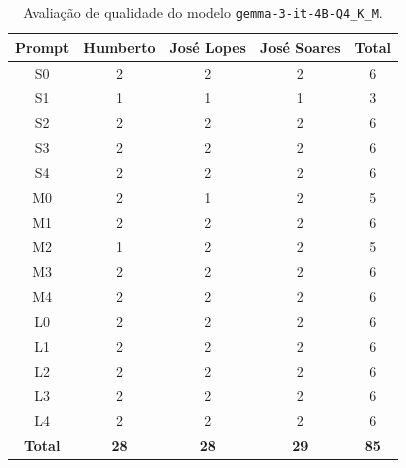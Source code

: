 \begin{table}[H]
    \centering
    \begin{tabular}{|c|c|c|c|c|}
        \hline
        \textbf{Prompt}      &
        \textbf{Humberto}    &
        \textbf{José Lopes}  &
        \textbf{José Soares} &
        \textbf{Total}       \\ \hline

        S0 & 2 & 2 & 2 & 6 \\ \hline
        S1 & 1 & 1 & 1 & 3 \\ \hline
        S2 & 2 & 2 & 2 & 6 \\ \hline
        S3 & 2 & 2 & 2 & 6 \\ \hline
        S4 & 2 & 2 & 2 & 6 \\ \hline
        M0 & 2 & 1 & 2 & 5 \\ \hline
        M1 & 2 & 2 & 2 & 6 \\ \hline
        M2 & 1 & 2 & 2 & 5 \\ \hline
        M3 & 2 & 2 & 2 & 6 \\ \hline
        M4 & 2 & 2 & 2 & 6 \\ \hline
        L0 & 2 & 2 & 2 & 6 \\ \hline
        L1 & 2 & 2 & 2 & 6 \\ \hline
        L2 & 2 & 2 & 2 & 6 \\ \hline
        L3 & 2 & 2 & 2 & 6 \\ \hline
        L4 & 2 & 2 & 2 & 6 \\ \hline

        \textbf{Total} & \textbf{28} & \textbf{28} & \textbf{29} & \textbf{85} \\ \hline
    \end{tabular}
    \caption{Avaliação de qualidade do modelo \texttt{gemma-3-it-4B-Q4\_K\_M}.}
\end{table}


